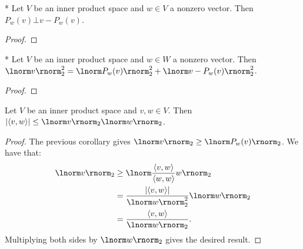     \begin{proposition}*
        Let $V$ be an inner product space and $w \in V$ a nonzero vector. Then $P_w(v) \bot v - P_w(v)$.
    \end{proposition}
        \begin{proof}
            
        \end{proof}

    \begin{corollary}*
        Let $V$ be an inner product space and $w \in W$ a nonzero vector. Then $\lnorm v \rnorm_2^2 = \lnorm P_w(v) \rnorm_2^2 + \lnorm v - P_w(v) \rnorm_2^2$.
    \end{corollary}
        \begin{proof}
            
        \end{proof}

    \begin{lemma}\label{lemma:c-s-ineq}
        Let $V$ be an inner product space and $v,w \in V$. Then $|\langle v,w \rangle| \leq \lnorm v \rnorm_2 \lnorm w \rnorm_2$.
    \end{lemma}
        \begin{proof}
            The previous corollary gives $\lnorm v \rnorm_2 \geq \lnorm P_w(v) \rnorm_2$. We have that:
                \begin{equation*}
                \begin{split}
                    \lnorm v \rnorm_2 
                    & \geq \lnorm \frac{\langle v,w \rangle}{\langle w,w \rangle}w \rnorm_2 \\
                    & = \frac{|\langle v,w \rangle|}{\lnorm w \rnorm_2^2}\lnorm w \rnorm_2 \\
                    & = \frac{\langle v,w \rangle}{\lnorm w \rnorm_2}.
                \end{split}
                \end{equation*}
            Multiplying both sides by $\lnorm w \rnorm_2$ gives the desired result.
        \end{proof}

